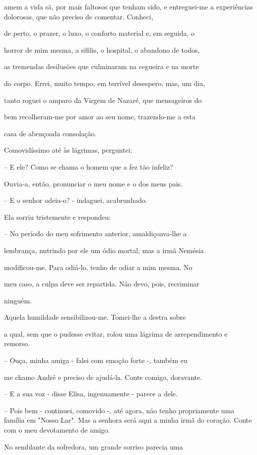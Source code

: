\documentclass[portuguese,12pt,a4paper]{scrbook}
\begin{document}
	amem a vida sã, por mais faltosos que tenham sido, e entreguei-me a experiências dolorosas, que não preciso de comentar. Conheci,
	
	de perto, o prazer, o luxo, o conforto material e, em seguida, o
	
	horror de mim mesma, a sífilis, o hospital, o abandono de todos,
	
	as tremendas desilusões que culminaram na cegueira e na morte
	
	do corpo. Errei, muito tempo, em terrível desespero, mas, um dia,
	
	tanto roguei o amparo da Virgem de Nazaré, que mensageiros do
	
	bem recolheram-me por amor ao seu nome, trazendo-me a esta
	
	casa de abençoada consolação.
	
	Comovidíssimo até às lágrimas, perguntei:
	
	
	– E ele? Como se chama o homem que a fez tão infeliz?
	
	Ouvia-a, então, pronunciar o meu nome e o dos meus pais.
	
	– E o senhor odeia-o? - indaguei, acabrunhado.
	
	Ela sorriu tristemente e respondeu:
	
	– No período do meu sofrimento anterior, amaldiçoava-lhe a
	
	lembrança, nutrindo por ele um ódio mortal; mas a irmã Nemésia
	
	modificou-me. Para odiá-lo, tenho de odiar a mim mesma. No
	
	meu caso, a culpa deve ser repartida. Não devo, pois, recriminar
	
	ninguém.
	
	Aquela humildade sensibilizou-me. Tomei-lhe a destra sobre
	
	a qual, sem que o pudesse evitar, rolou uma lágrima de arrependimento e remorso.
	
	– Ouça, minha amiga - falei com emoção forte -, também eu
	
	me chamo André e preciso de ajudá-la. Conte comigo, doravante.
	
	– E a sua voz - disse Elisa, ingenuamente - parece a dele.
	
	– Pois bem - continuei, comovido -, até agora, não tenho propriamente uma família em "Nosso Lar". Mas a senhora será aqui a minha irmã do coração. Conte com o meu devotamento de amigo.
	
	No semblante da sofredora, um grande sorriso parecia uma
	
\end{document}
